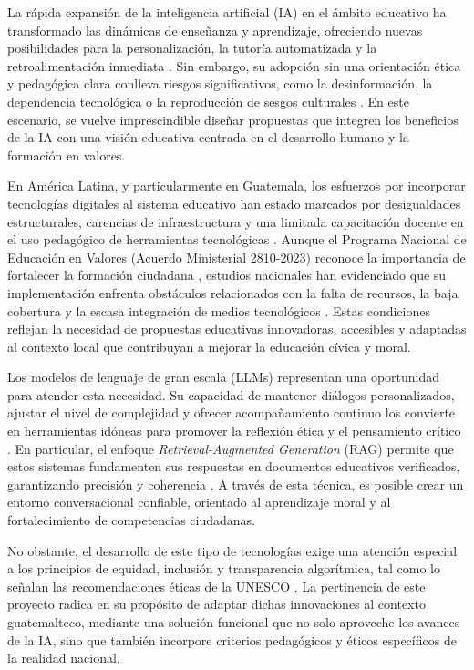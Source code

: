 La rápida expansión de la inteligencia artificial (IA) en el ámbito educativo
ha transformado las dinámicas de enseñanza y aprendizaje, ofreciendo nuevas
posibilidades para la personalización, la tutoría automatizada y la
retroalimentación inmediata \cite{frontiers2024chatgpt}. Sin embargo, su
adopción sin una orientación ética y pedagógica clara conlleva riesgos
significativos, como la desinformación, la dependencia tecnológica o la
reproducción de sesgos culturales \cite{tulsiani2024chatgpt}. En este
escenario, se vuelve imprescindible diseñar propuestas que integren los
beneficios de la IA con una visión educativa centrada en el desarrollo humano y
la formación en valores.

En América Latina, y particularmente en Guatemala, los esfuerzos por incorporar
tecnologías digitales al sistema educativo han estado marcados por
desigualdades estructurales, carencias de infraestructura y una limitada
capacitación docente en el uso pedagógico de herramientas tecnológicas
\cite{worldbank2022revolution,rivas2023future}. Aunque el Programa Nacional de
Educación en Valores (Acuerdo Ministerial 2810-2023) reconoce la importancia de
fortalecer la formación ciudadana \cite{mineduc2023acuerdo}, estudios
nacionales han evidenciado que su implementación enfrenta obstáculos
relacionados con la falta de recursos, la baja cobertura y la escasa
integración de medios tecnológicos \cite{cien2019diagnostico}. Estas
condiciones reflejan la necesidad de propuestas educativas innovadoras,
accesibles y adaptadas al contexto local que contribuyan a mejorar la educación
cívica y moral.

Los modelos de lenguaje de gran escala (LLMs) representan una oportunidad para
atender esta necesidad. Su capacidad de mantener diálogos personalizados,
ajustar el nivel de complejidad y ofrecer acompañamiento continuo los convierte
en herramientas idóneas para promover la reflexión ética y el pensamiento
crítico \cite{qin2024transforming,cordova2025aiagents}. En particular, el
enfoque \textit{Retrieval-Augmented Generation} (RAG) permite que estos sistemas
fundamenten sus respuestas en documentos educativos verificados, garantizando
precisión y coherencia \cite{levonian2025safechats}. A través de esta técnica,
es posible crear un entorno conversacional confiable, orientado al aprendizaje
moral y al fortalecimiento de competencias ciudadanas.

No obstante, el desarrollo de este tipo de tecnologías exige una atención
especial a los principios de equidad, inclusión y transparencia algorítmica,
tal como lo señalan las recomendaciones éticas de la UNESCO
\cite{unesco2021ethics,unesco2021guidance}. La pertinencia de este proyecto
radica en su propósito de adaptar dichas innovaciones al contexto guatemalteco,
mediante una solución funcional que no solo aproveche los avances de la IA,
sino que también incorpore criterios pedagógicos y éticos específicos de la
realidad nacional.


